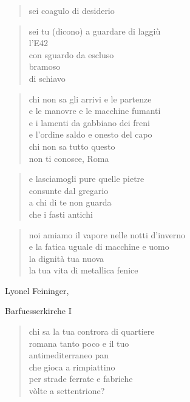 	\begin{verse}
		sei coagulo di desiderio
	\end{verse}

	\begin{verse}
		sei tu (dicono) a guardare di laggiù\\
		l’E42\\
		con sguardo da escluso\\
		bramoso\\
		di schiavo
	\end{verse}

\clearpage


	\begin{verse}
		chi non sa gli arrivi e le partenze\\
		e le manovre e le macchine fumanti\\
		e i lamenti da gabbiano dei freni\\
		e l'ordine saldo e onesto del capo\\
		chi non sa tutto questo\\
		non ti conosce, Roma
	\end{verse}

	\begin{verse}
		e lasciamogli pure quelle pietre\\
		consunte dal gregario\\
		a chi di te non guarda\\
		che i fasti antichi
	\end{verse}

	\begin{verse}
		noi amiamo il vapore nelle notti d'inverno\\
		e la fatica uguale di macchine e uomo\\
		la dignità tua nuova\\
		la tua vita di metallica fenice
	\end{verse}

\clearpage


\begin{artItem}
	Lyonel Feininger, \begin{otherlanguage}{german}%
		Barfuesserkirche I%
	\end{otherlanguage}
\end{artItem}

	\begin{verse}
		chi sa la tua controra di quartiere\\
		romana tanto poco e il tuo\\
		antimediterraneo pan\\
		che gioca a rimpiattino\\
		per strade ferrate e fabriche\\
		vòlte a settentrione?
	\end{verse}


